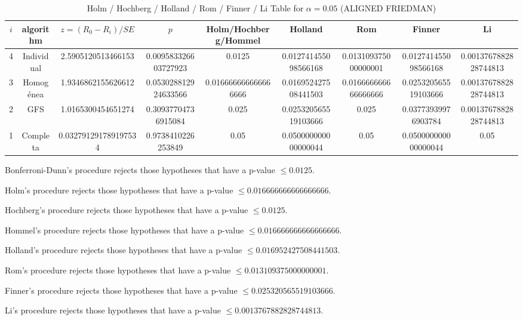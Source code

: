 \documentclass[a4paper,10pt]{article}
\begin{document}
\begin{landscape}
\begin{table}[!htp]
\centering\scriptsize
\caption{Holm / Hochberg / Holland / Rom / Finner / Li Table for $\alpha=0.05$ (ALIGNED FRIEDMAN)}
\begin{tabular}{ccccccccc}
$i$&algorithm&$z=(R_0 - R_i)/SE$&$p$&Holm/Hochberg/Hommel&Holland&Rom&Finner&Li\\
\hline
4&Individual&2.5905120513466153&0.009583326603727923&0.0125&0.012741455098566168&0.013109375000000001&0.012741455098566168&0.0013767882828744813\\
3&Homogénea&1.9346862155626612&0.053028812924633566&0.016666666666666666&0.016952427508441503&0.016666666666666666&0.025320565519103666&0.0013767882828744813\\
2&GFS&1.0165300454651274&0.30937704736915084&0.025&0.025320565519103666&0.025&0.03773939976903784&0.0013767882828744813\\
1&Completa&0.032791291789197534&0.9738410226253849&0.05&0.050000000000000044&0.05&0.050000000000000044&0.05\\
\hline
\end{tabular}
\end{table}
Bonferroni-Dunn's procedure rejects those hypotheses that have a p-value $\le0.0125$.


Holm's procedure rejects those hypotheses that have a p-value $\le0.016666666666666666$.


Hochberg's procedure rejects those hypotheses that have a p-value $\le0.0125$.


Hommel's procedure rejects those hypotheses that have a p-value $\le0.016666666666666666$.


Holland's procedure rejects those hypotheses that have a p-value $\le0.016952427508441503$.


Rom's procedure rejects those hypotheses that have a p-value $\le0.013109375000000001$.


Finner's procedure rejects those hypotheses that have a p-value $\le0.025320565519103666$.


Li's procedure rejects those hypotheses that have a p-value $\le0.0013767882828744813$.



\newpage


\end{landscape}
\end{document}
